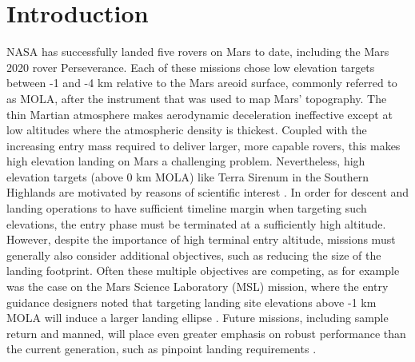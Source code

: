 \documentclass[journal ]{new-aiaa}
\begin{document}
\section*{Introduction}


\lettrine{N}{ASA} has successfully landed five rovers on Mars to date, including the Mars 2020 rover Perseverance. Each of these missions chose low elevation targets between -1 and -4 km relative to the Mars areoid surface, commonly referred to as MOLA, after the instrument that was used to map Mars' topography. The thin Martian atmosphere makes aerodynamic deceleration ineffective except at low altitudes where the atmospheric density is thickest. Coupled with the increasing entry mass required to deliver larger, more capable rovers, this makes high elevation landing on Mars a challenging problem. Nevertheless, high elevation targets (above 0 km MOLA) like Terra Sirenum in the Southern Highlands are motivated by reasons of scientific interest \cite{MarsWater}. In order for descent and landing operations to have sufficient timeline margin \cite{BraunMarsEDL,MSL_EDL2} when targeting such elevations, the entry phase must be terminated at a sufficiently high altitude.
However, despite the importance of high terminal entry altitude, missions must generally also consider additional objectives, such as reducing the size of the landing footprint. Often these multiple objectives are competing, as for example was the case on the Mars Science Laboratory (MSL) mission, where the entry guidance designers noted that targeting landing site elevations above -1 km MOLA will induce a larger landing ellipse \cite{MSL_EDL2}. 
Future missions, including sample return \cite{MSR} and manned, will place even greater emphasis on robust performance than the current generation, such as pinpoint landing requirements \cite{EvolvableMars}. 
\end{document}
